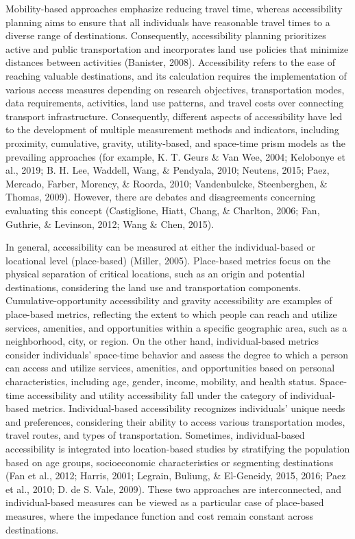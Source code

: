 \documentclass[
11pt, %
oneside, %
english, %
singlespacing, %
]{macthesis} %
\begin{document}
Mobility-based approaches emphasize reducing travel time, whereas accessibility planning aims to ensure that all individuals have reasonable travel times to a diverse range of destinations. Consequently, accessibility planning prioritizes active and public transportation and incorporates land use policies that minimize distances between activities (Banister, 2008). Accessibility refers to the ease of reaching valuable destinations, and its calculation requires the implementation of various access measures depending on research objectives, transportation modes, data requirements, activities, land use patterns, and travel costs over connecting transport infrastructure. Consequently, different aspects of accessibility have led to the development of multiple measurement methods and indicators, including proximity, cumulative, gravity, utility-based, and space-time prism models as the prevailing approaches (for example, K. T. Geurs \& Van Wee, 2004; Kelobonye et al., 2019; B. H. Lee, Waddell, Wang, \& Pendyala, 2010; Neutens, 2015; Paez, Mercado, Farber, Morency, \& Roorda, 2010; Vandenbulcke, Steenberghen, \& Thomas, 2009). However, there are debates and disagreements concerning evaluating this concept (Castiglione, Hiatt, Chang, \& Charlton, 2006; Fan, Guthrie, \& Levinson, 2012; Wang \& Chen, 2015).

In general, accessibility can be measured at either the individual-based or locational level (place-based) (Miller, 2005). Place-based metrics focus on the physical separation of critical locations, such as an origin and potential destinations, considering the land use and transportation components. Cumulative-opportunity accessibility and gravity accessibility are examples of place-based metrics, reflecting the extent to which people can reach and utilize services, amenities, and opportunities within a specific geographic area, such as a neighborhood, city, or region. On the other hand, individual-based metrics consider individuals' space-time behavior and assess the degree to which a person can access and utilize services, amenities, and opportunities based on personal characteristics, including age, gender, income, mobility, and health status. Space-time accessibility and utility accessibility fall under the category of individual-based metrics. Individual-based accessibility recognizes individuals' unique needs and preferences, considering their ability to access various transportation modes, travel routes, and types of transportation. Sometimes, individual-based accessibility is integrated into location-based studies by stratifying the population based on age groups, socioeconomic characteristics or segmenting destinations (Fan et al., 2012; Harris, 2001; Legrain, Buliung, \& El-Geneidy, 2015, 2016; Paez et al., 2010; D. de S. Vale, 2009). These two approaches are interconnected, and individual-based measures can be viewed as a particular case of place-based measures, where the impedance function and cost remain constant across destinations.
\end{document}
